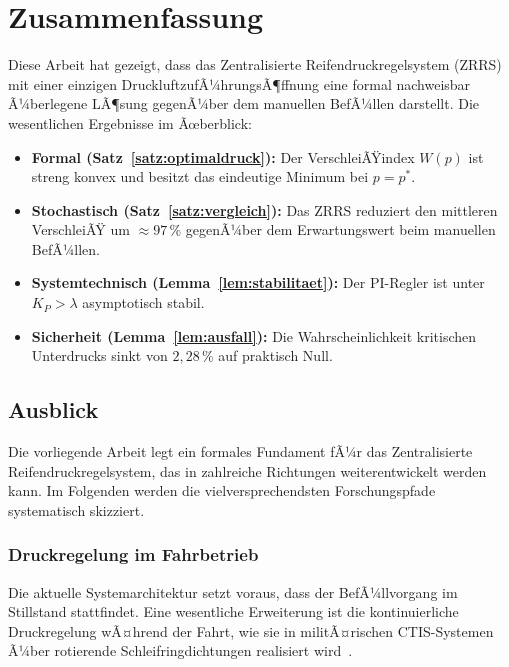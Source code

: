 ﻿\documentclass[a4paper,12pt]{article}
\theoremstyle{definition}
\begin{document}
\section{Zusammenfassung}

Diese Arbeit hat gezeigt, dass das Zentralisierte Reifendruckregelsystem (ZRRS)
mit einer einzigen DruckluftzufÃ¼hrungsÃ¶ffnung eine formal nachweisbar Ã¼berlegene
LÃ¶sung gegenÃ¼ber dem manuellen BefÃ¼llen darstellt. Die wesentlichen Ergebnisse
im Ãœberblick:

\begin{itemize}
    \item \textbf{Formal (Satz~\ref{satz:optimaldruck}):} Der VerschleiÃŸindex
    $W(p)$ ist streng konvex und besitzt das eindeutige Minimum bei $p = p^*$.

    \item \textbf{Stochastisch (Satz~\ref{satz:vergleich}):} Das ZRRS reduziert
    den mittleren VerschleiÃŸ um $\approx 97\,\%$ gegenÃ¼ber dem Erwartungswert
    beim manuellen BefÃ¼llen.

    \item \textbf{Systemtechnisch (Lemma~\ref{lem:stabilitaet}):} Der PI-Regler
    ist unter $K_P > \lambda$ asymptotisch stabil.

    \item \textbf{Sicherheit (Lemma~\ref{lem:ausfall}):} Die Wahrscheinlichkeit
    kritischen Unterdrucks sinkt von $2{,}28\,\%$ auf praktisch Null.
\end{itemize}

\subsection{Ausblick}

Die vorliegende Arbeit legt ein formales Fundament fÃ¼r das Zentralisierte
Reifendruckregelsystem, das in zahlreiche Richtungen weiterentwickelt werden
kann. Im Folgenden werden die vielversprechendsten Forschungspfade systematisch
skizziert.

\subsubsection{Druckregelung im Fahrbetrieb}

Die aktuelle Systemarchitektur setzt voraus, dass der BefÃ¼llvorgang im
Stillstand stattfindet. Eine wesentliche Erweiterung ist die kontinuierliche
Druckregelung wÃ¤hrend der Fahrt, wie sie in militÃ¤rischen CTIS-Systemen
Ã¼ber rotierende Schleifringdichtungen realisiert wird~\cite{ctis_milspec}.
\end{document}
